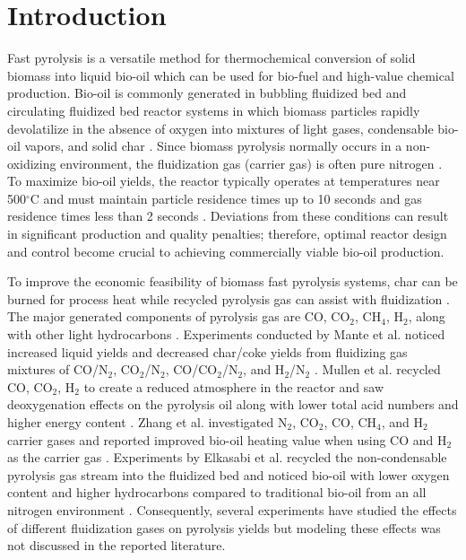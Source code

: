 
\section{Introduction}

Fast pyrolysis is a versatile method for thermochemical conversion of solid biomass into liquid bio-oil which can be used for bio-fuel and high-value chemical production. Bio-oil is commonly generated in bubbling fluidized bed and circulating fluidized bed reactor systems in which biomass particles rapidly devolatilize in the absence of oxygen into mixtures of light gases, condensable bio-oil vapors, and solid char \cite{Bridgwater-1999, Bridgwater-2018a, Mohan-2006}. Since biomass pyrolysis normally occurs in a non-oxidizing environment, the fluidization gas (carrier gas) is often pure nitrogen \cite{Mohan-2006}. To maximize bio-oil yields, the reactor typically operates at temperatures near 500$^\circ$C and must maintain particle residence times up to 10 seconds and gas residence times less than 2 seconds \cite{Bridgwater-2018a}. Deviations from these conditions can result in significant production and quality penalties; therefore, optimal reactor design and control become crucial to achieving commercially viable bio-oil production.

To improve the economic feasibility of biomass fast pyrolysis systems, char can be burned for process heat while recycled pyrolysis gas can assist with fluidization \cite{Bridgwater-1999, Mante-2012, Elkasabi-2015}. The major generated components of pyrolysis gas are CO, CO$_2$, CH$_4$, H$_2$, along with other light hydrocarbons \cite{Asadullah-2008, Zhang-2011}. Experiments conducted by Mante et al. noticed increased liquid yields and decreased char/coke yields from fluidizing gas mixtures of CO/N$_2$, CO$_2$/N$_2$, CO/CO$_2$/N$_2$, and H$_2$/N$_2$ \cite{Mante-2012}. Mullen et al. recycled CO, CO$_2$, H$_2$ to create a reduced atmosphere in the reactor and saw deoxygenation effects on the pyrolysis oil along with lower total acid numbers and higher energy content \cite{Mullen-2013}. Zhang et al. investigated N$_2$, CO$_2$, CO, CH$_4$, and H$_2$ carrier gases and reported improved bio-oil heating value when using CO and H$_2$ as the carrier gas \cite{Zhang-2011}. Experiments by Elkasabi et al. recycled the non-condensable pyrolysis gas stream into the fluidized bed and noticed bio-oil with lower oxygen content and higher hydrocarbons compared to traditional bio-oil from an all nitrogen environment \cite{Elkasabi-2015}. Consequently, several experiments have studied the effects of different fluidization gases on pyrolysis yields but modeling these effects was not discussed in the reported literature.

